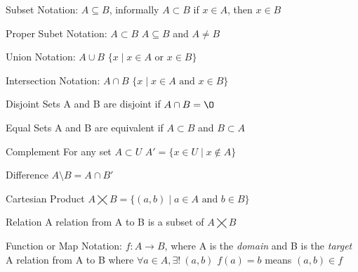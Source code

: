 

\begin{flashcard}[Definition]{Subset}
  Notation: $A \subseteq B$, informally $A \subset B$
  \vfill
  if $x \in A$, then $x \in B$
\end{flashcard}

\begin{flashcard}[Definition]{Proper Subet}
  Notation: $A \subset B$
  \vfill
  $A \subseteq B$ and $A \neq B$
\end{flashcard}

\begin{flashcard}[Definition]{Union}
  Notation: $A \cup B$
  \vfill
  $\{x \mid x \in A \text{ or } x \in B\}$
\end{flashcard}

\begin{flashcard}[Definition]{Intersection}
  Notation: $A \cap B$
  \vfill
  $\{x \mid x \in A \text{ and } x \in B\}$
\end{flashcard}

\begin{flashcard}[Definition]{Disjoint Sets}
  A and B are disjoint if $A \cap B = \O$
\end{flashcard}

\begin{flashcard}[Definition]{Equal Sets}
  A and B are equivalent if $A \subset B$ and $B \subset A$
\end{flashcard}

\begin{flashcard}[Definition]{Complement}
  For any set $A \subset U$
  \vfill
  $A' = \{x \in U \mid x \notin A \}$
\end{flashcard}

\begin{flashcard}[Definition]{Difference}
  $A \setminus B = A \cap B'$
\end{flashcard}

\begin{flashcard}[Definition]{Cartesian Product}
  $A \bigtimes B = \{ (a,b) \mid a \in A \text{ and } b \in B \}$
\end{flashcard}

\begin{flashcard}[Definition]{Relation}
  A relation from A to B is a subset of $A \bigtimes B$
\end{flashcard}

\begin{flashcard}[Definition]{Function or Map}
  Notation: $f: A \to B$, where A is the \emph{domain} and B is the \emph{target}
  \vfill
  A relation from A to B where $\forall a \in A, \exists!\ (a,b)$
  \vfill
  $f(a) = b$ means $(a,b) \in f$
\end{flashcard}

